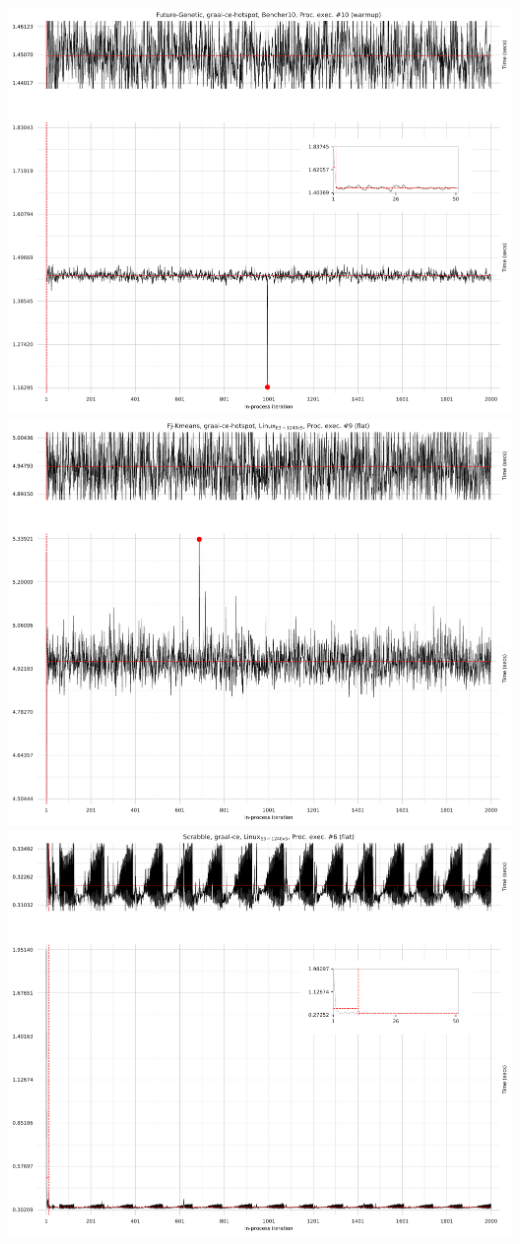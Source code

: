 \documentclass[a4paper]{article}
\begin{document}
\includegraphics[width=.45\textwidth]{plots/outliers1.pdf}
\includegraphics[width=.45\textwidth]{plots/fastearly1.pdf}\\
\includegraphics[width=.45\textwidth]{plots/steps1.pdf}
\end{document}
